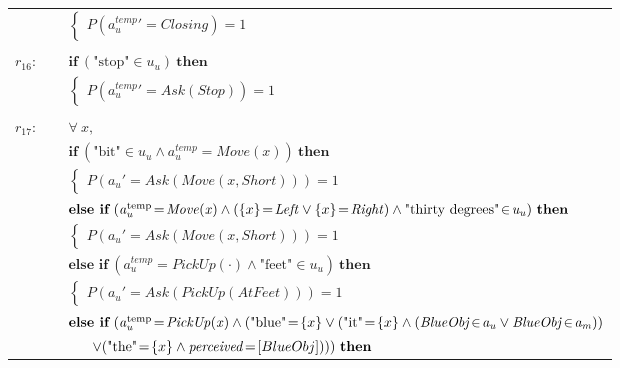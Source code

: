 \begin{footnotesize}
\begin{longtable}{p{1cm}l}
 & \;\;\;\;\; $ \begin{cases}P(\mathit{a_u^{\text{temp}}}'\!=\!\mathit{Closing})\!=\!1 \end{cases}$ \\ \\[-1mm]
$r_{16}$: \ \ & $ \textbf{if} \ (\text{"stop"}\!\in\!\mathit{u_u}) \ \textbf{then} $ \\
 & \;\;\;\;\; $ \begin{cases}P(\mathit{a_u^{\text{temp}}}'\!=\!\mathit{Ask(Stop)})\!=\!1 \end{cases}$ \\ \\[-1mm]
$r_{17}$: \ \ & $\forall \ x, $ \\ & $ \textbf{if} \ (\text{"bit"}\!\in\!\mathit{u_u} \land \mathit{a_u^{\text{temp}}}\!=\!\mathit{Move({x})}) \ \textbf{then} $ \\
 & \;\;\;\;\; $ \begin{cases}P(\mathit{a_u}'\!=\!\mathit{Ask(Move({x},Short))})\!=\!1 \end{cases}$ \vspace{1mm} \\ & $ \textbf{else if} \ (\mathit{a_u^{\text{temp}}}\!=\!\mathit{Move({x})} \land (\mathit\{x\}\!=\!\mathit{Left} \lor \mathit\{x\}\!=\!\mathit{Right}) \land \text{"thirty degrees"}\!\in\!\mathit{u_u}) \ \textbf{then}$ \\
& \;\;\;\;\; $ \begin{cases}P(\mathit{a_u}'\!=\!\mathit{Ask(Move({x},Short))})\!=\!1 \end{cases}$ \vspace{1mm} \\ & $ \textbf{else if} \ (\mathit{a_u^{\text{temp}}}\!=\!\mathit{PickUp(\cdot)} \land \text{"feet"}\!\in\!\mathit{u_u}) \ \textbf{then}$ \\
& \;\;\;\;\; $ \begin{cases}P(\mathit{a_u}'\!=\!\mathit{Ask(PickUp(AtFeet))})\!=\!1 \end{cases}$  \vspace{1mm} \\ & $ \textbf{else if} \ (\mathit{a_u^{\text{temp}}}\!=\!\mathit{PickUp({x})} \land (\text{"blue"}\!=\!\mathit\{x\} \lor (\text{"it"}\!=\!\mathit\{x\} \land (\mathit{BlueObj}\!\in\!\mathit{a_u} \lor \mathit{BlueObj}\!\in\!\mathit{a_m})) $ \\ & $\ \ \ \ \ \lor (\text{"the"}\!=\!\mathit\{x\} \land \mathit{perceived}\!=\![BlueObj] ))) \ \textbf{then}$ \\

\end{longtable}
\end{footnotesize}
